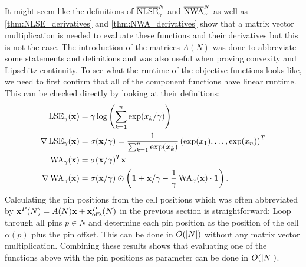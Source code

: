 It might seem like the definitions of \(\overline{\operatorname{NLSE}}_\gamma^N\) and \(\overline{\operatorname{NWA}}_\gamma^N\)
as well as \cref{thm:NLSE_derivatives} and \cref{thm:NWA_derivatives}
show that a matrix vector multiplication is needed to evaluate these functions and their derivatives
but this is not the case.
The introduction of the matrices \(A(N)\) was done to abbreviate some statements and definitions
and was also useful when proving convexity and Lipschitz continuity.
To see what the runtime of the objective functions looks like, we need to first confirm
that all of the component functions have linear runtime.
This can be checked directly by looking at their definitions:
\begin{align*}
 \operatorname{LSE}_\gamma(\mathbf{x})         &= \gamma \log \left({\sum_{k = 1}^n \exp(x_k/\gamma)}\right) \\
 \nabla \operatorname{LSE}_\gamma (\mathbf{x}) &= \sigma(\mathbf{x}/\gamma) = \frac{1}{\sum_{k = 1}^n \exp(x_k)} \left({ \exp(x_1), \ldots, \exp(x_n) }\right)^T \\
 \operatorname{WA}_\gamma(\mathbf{x})          &= \sigma(\mathbf{x} / \gamma)^T \mathbf{x} \\
 \nabla \operatorname{WA}_\gamma (\mathbf{x})  &= \sigma(\mathbf{x}/\gamma) \odot \left({ \mathbf{1} + \mathbf{x}/\gamma - \frac{1}{\gamma} \operatorname{WA}_\gamma(\mathbf{x}) \cdot \mathbf{1} }\right).
\end{align*}
Calculating the pin positions from the cell positions
which was often abbreviated by \(\mathbf{x}^P(N) = A(N) \mathbf{x} + \mathbf{x}_{\operatorname{offs}}^P(N)\) in the previous section
is straightforward:
Loop through all pins \(p \in N\) and determine each pin position as the position of the cell \(\alpha(p)\) plus the pin offset.
This can be done in \(O(\lvert N\rvert)\) without any matrix vector multiplication.
Combining these results shows that evaluating one of the functions above with the pin positions
as parameter can be done in \(O(\lvert N\rvert)\).

